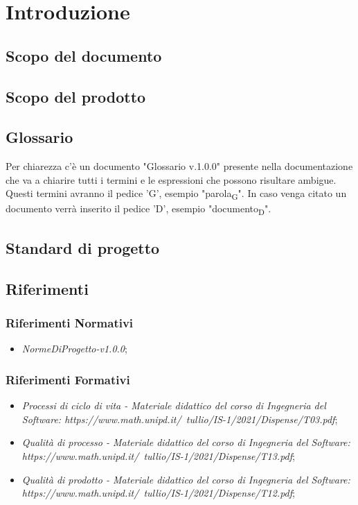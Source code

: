 \section{Introduzione}
    \subsection{Scopo del documento}
    \subsection{Scopo del prodotto}
    \subsection{Glossario}
    Per chiarezza c'è un documento "Glossario v.1.0.0" presente nella documentazione che va a chiarire tutti i termini e le espressioni che possono risultare ambigue. Questi termini avranno il pedice 'G', esempio "parola\textsubscript G".
In caso venga citato un documento verrà inserito il pedice 'D', esempio "documento\textsubscript D".
    \subsection{Standard di progetto}
    \subsection{Riferimenti}
        \subsubsection{Riferimenti Normativi}
            \begin{itemize}
            \item \emph{NormeDiProgetto-v1.0.0};
            \end{itemize}
        \subsubsection{Riferimenti Formativi}
            \begin{itemize}
            \item \emph{Processi di ciclo di vita - Materiale didattico del corso di Ingegneria del Software: https://www.math.unipd.it/~tullio/IS-1/2021/Dispense/T03.pdf};
            \item \emph{Qualità di processo - Materiale didattico del corso di Ingegneria del Software: https://www.math.unipd.it/~tullio/IS-1/2021/Dispense/T13.pdf};
            \item \emph{Qualità di prodotto - Materiale didattico del corso di Ingegneria del Software: https://www.math.unipd.it/~tullio/IS-1/2021/Dispense/T12.pdf};
            \end{itemize}
